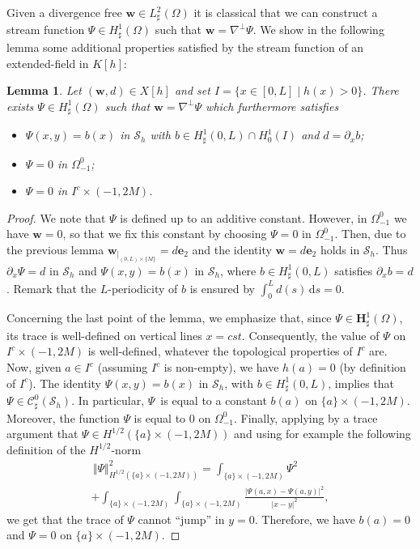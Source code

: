 \documentclass[11pt]{article}
\let\mathcal\mathscr
\newtheorem{lemma}[theorem]{Lemma}
\theoremstyle{remark}
\theoremstyle{definition}
\newcommand{\norme}[1]{\,\Vert #1\Vert}
\newcommand{\dd}{\,\mathrm{d}}
\newcommand{\wg}{\boldsymbol{w}}
\newcommand{\BS}[1]{\boldsymbol{#1}}
\begin{document}
Given a divergence free $\wg \in {L}^2_{\sharp}(\Omega)$
it is classical that we can construct a stream function $\Psi \in {H}^1_{\sharp}(\Omega)$ such that $\wg = \nabla^{\bot} \Psi$. We show in the following lemma some additional properties satisfied by the stream function of an extended-field in $K[h]$:

\begin{lemma}\label{lemma.X[h]}
Let $(\wg, d)\in X[h]$ and set $I=\{x\in[0,L]\mid h(x)>0\}$. There exists $\Psi \in {H}^1_\sharp(\Omega)$ such that $\wg=\nabla^\perp\Psi$ which furthermore satisfies
\begin{itemize}
\item $\Psi(x,y)=b(x)$ in $\mathcal{S}_h$ with $b\in H^{1}_{\sharp}(0,L) \cap H^{1}_0(I)$ and $d = \partial_x b$;
\item $\Psi =0$ in $\Omega_{-1}^0$;
\item $\Psi=0$ in $I^{c}\times(-1,2M)$.
\end{itemize}
\end{lemma}
\begin{proof}
We note that $\Psi$ is defined up to an additive constant.
However, in $\Omega_{-1}^0$ we have $\wg=0$, so that we fix this constant by choosing $\Psi=0$ in $\Omega_{-1}^0$. Then,
due to the previous lemma $\wg_{\vert_{(0, L)\times \{M\}}}= d\BS{e}_{2}$ and the identity $\wg=d\BS{e}_{2}$ holds in $\mathcal{S}_{h}$. Thus $\partial_{x}\Psi=d$ in $\mathcal{S}_{h}$ and $\Psi(x,y)=b(x)$ in $\mathcal{S}_{h}$, where $b\in H^{1}_{\sharp}(0,L)$ satisfies $\partial_x b = d$. Remark that the $L$-periodicity of $b$ is ensured by $\int_{0}^{L}d(s)\dd s =0$.

Concerning the last point of the lemma, we emphasize that,
since $\Psi \in \BS{H}^1_{\sharp}(\Omega)$, its trace is well-defined
on vertical lines $x=cst$. Consequently, the value of $\Psi$
on $I^{c} \times (-1,2M)$ is well-defined, whatever the topological properties of $I^c$ are. Now, given $a \in I^{c}$ (assuming $I^{c}$ is non-empty), we have $h(a)=0$ (by definition of $I^c$). The identity $\Psi(x,y)=b(x)$ in $ \mathcal{S}_{h}$, with $b\in H^{1}_{\sharp}(0,L)$, implies that $\Psi\in\mathcal{C}_\sharp^{0}(\mathcal{S}_{h})$. In particular, $\Psi$~is equal to a constant $b(a)$ on $\{a\}\times(-1,2M)$. Moreover, the function $\Psi$ is equal to $0$ on $\Omega_{-1}^{0}$.
Finally, applying by a trace argument that $\Psi \in H^{1/2}(\{a\}\times (-1,2M))$ and using for example the following definition of the $H^{1/2}$-norm\vspace*{-3pt}
\begin{multline*}\norme{\Psi}_{H^{1/2}(\{a\}\times(-1,2M))}^{2} = \int_{\{a\}\times(-1,2M)}\Psi^{2} \\[-5pt]
+ \int_{\{a\}\times(-1,2M)}\int_{\{a\}\times(-1,2M)}\frac{\vert\Psi(a,x)-\Psi(a,y)\vert^{2}}{\vert x-y\vert^{2}},
\end{multline*}
we get that the trace of $\Psi$ cannot ``jump'' in $y=0$.
Therefore, we have $b(a)=0$ and $\Psi=0$ on $\{a\}\times(-1,2M)$.
\end{proof}
\end{document}
